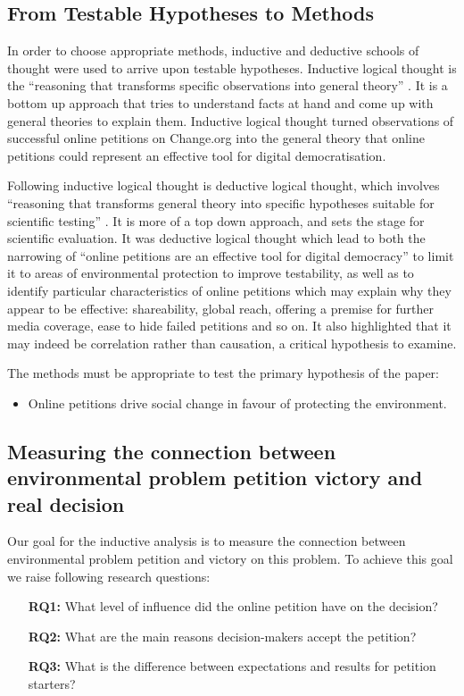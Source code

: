 \subsection{From Testable Hypotheses to Methods}
\label{subsec:socialmethods}
In order to choose appropriate methods, inductive and deductive schools of thought were used to arrive upon testable hypotheses.
Inductive logical thought is the ``reasoning that transforms specific observations into general theory'' \citep[pg. 72]{Plummer11}. It is a bottom up approach that tries to understand facts at hand and come up with general theories to explain them. Inductive logical thought turned observations of successful online petitions on Change.org into the general theory that online petitions could represent an effective tool for digital democratisation.\par\vspace{0.2cm}
Following inductive logical thought is deductive logical thought, which involves ``reasoning that transforms general theory into specific hypotheses suitable for scientific testing'' \citep[pg. 72f]{Plummer11}. It is more of a top down approach, and sets the stage for scientific evaluation. It was deductive logical thought which lead to both the narrowing of ``online petitions are an effective tool for digital democracy'' to limit it to areas of environmental protection to improve testability, as well as to identify particular characteristics of online petitions which may explain why they appear to be effective: shareability, global reach, offering a premise for further media coverage, ease to hide failed petitions and so on. It also highlighted that it may indeed be correlation rather than causation, a critical hypothesis to examine.\par\vspace{0.2cm}

The methods must be appropriate to test the primary hypothesis of the paper:
\begin{itemize}
\item Online petitions drive social change in favour of protecting the environment.
\end{itemize}

\subsection{Measuring the connection between environmental problem petition victory and real decision}

Our goal for the inductive analysis is to measure the connection between environmental problem petition and victory on this problem. To achieve this goal we raise following research questions:
\begin{itemize}
	\item[\textbf{RQ1:}] What level of influence did the online petition have on the decision?
	\item[\textbf{RQ2:}] What are the main reasons decision-makers accept the petition?
	\item[\textbf{RQ3:}] What is the difference between expectations and results for petition starters?
\end{itemize}
